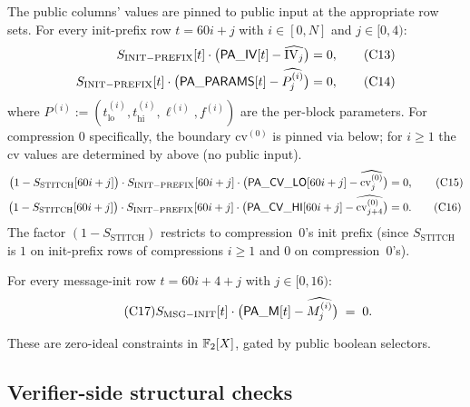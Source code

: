 The public columns' values are pinned to public input at the
appropriate row sets. For every init-prefix row $t = 60i + j$ with
$i \in [0, N]$ and $j \in [0, 4)$:
\begin{align}
S_{\mathrm{INIT-PREFIX}}[t] \cdot \bigl(\mathsf{PA\_IV}[t] - \widehat{\mathrm{IV}_j}\bigr) &= 0, \tag{C13}\label{con:b3-init-iv}\\
S_{\mathrm{INIT-PREFIX}}[t] \cdot \bigl(\mathsf{PA\_PARAMS}[t] - \widehat{P^{(i)}_j}\bigr) &= 0, \tag{C14}\label{con:b3-init-params}
\end{align}
where $P^{(i)} := (t^{(i)}_{\mathrm{lo}}, t^{(i)}_{\mathrm{hi}},
\ell^{(i)}, f^{(i)})$ are the per-block parameters. For compression
$0$ specifically, the boundary $\mathrm{cv}^{(0)}$ is pinned via
 below; for $i \ge 1$ the cv values are
determined by  above (no
public input).
\begin{align}
\bigl(1 - S_{\mathrm{STITCH}}[60i + j]\bigr) \cdot
S_{\mathrm{INIT-PREFIX}}[60i + j] \cdot
\bigl(\mathsf{PA\_CV\_LO}[60i + j] - \widehat{\mathrm{cv}^{(0)}_j}\bigr) &= 0, \tag{C15}\label{con:b3-init-cv0}\\
\bigl(1 - S_{\mathrm{STITCH}}[60i + j]\bigr) \cdot
S_{\mathrm{INIT-PREFIX}}[60i + j] \cdot
\bigl(\mathsf{PA\_CV\_HI}[60i + j] - \widehat{\mathrm{cv}^{(0)}_{j+4}}\bigr) &= 0. \tag{C16}\label{con:b3-init-cv1}
\end{align}
The factor $(1 - S_{\mathrm{STITCH}})$ restricts 
to compression~$0$'s init prefix (since $S_{\mathrm{STITCH}}$ is $1$
on init-prefix rows of compressions $i \ge 1$ and $0$ on
compression~$0$'s).

For every message-init row $t = 60i + 4 + j$ with $j \in [0, 16)$:
\begin{equation}\tag{C17}\label{con:b3-msg-init}
S_{\mathrm{MSG-INIT}}[t] \cdot \bigl(\mathsf{PA\_M}[t] - \widehat{M^{(i)}_j}\bigr) \;=\; 0.
\end{equation}

These are zero-ideal constraints in $\mathbb{F}_2[X]$, gated by public boolean
selectors.

\subsection{Verifier-side structural checks}\label{cons:b3-public-checks}

